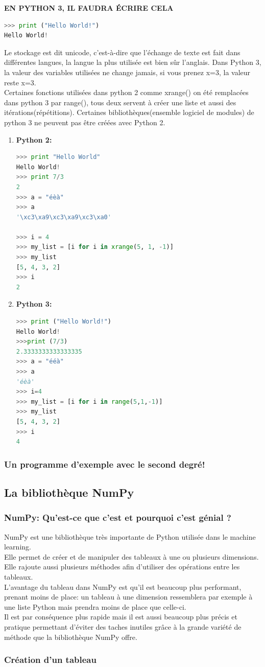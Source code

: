 \documentclass[a4paper, 12pt]{article}
\numberwithin{equation}{subsection}
\begin{document}
\textbf{EN PYTHON 3, IL FAUDRA ÉCRIRE CELA}\\
\begin{lstlisting}[language=Python]
>>> print ("Hello World!")
Hello World!
\end{lstlisting}
Le stockage est dit unicode, c'est-à-dire que l’échange de texte est fait dans différentes langues, la langue la plus utilisée est bien sûr l’anglais. Dans Python 3, la valeur des variables utilisées ne change jamais, si vous prenez x=3, la valeur reste x=3.\\
Certaines fonctions utilisées dans python 2 comme xrange() on été remplacées dans python 3 par range(), tous deux servent à créer une liste et aussi des itérations(répétitions). Certaines bibliothèques(ensemble logiciel de modules) de python 3 ne peuvent pas être créées avec Python 2.\\
\begin{enumerate}
  \item \textbf{Python 2:}
\begin{lstlisting}[language=Python]
>>> print "Hello World"
Hello World!
>>> print 7/3
2
>>> a = "éèà"
>>> a
'\xc3\xa9\xc3\xa9\xc3\xa0'

>>> i = 4
>>> my_list = [i for i in xrange(5, 1, -1)]
>>> my_list
[5, 4, 3, 2]
>>> i
2
\end{lstlisting}
  \item \textbf{Python 3:}
\begin{lstlisting}[language=Python]
>>> print ("Hello World!")
Hello World!
>>>print (7/3)
2.3333333333333335
>>> a = "ééà"
>>> a
'éèà'
>>> i=4
>>> my_list = [i for i in range(5,1,-1)]
>>> my_list
[5, 4, 3, 2]
>>> i
4
\end{lstlisting}
\end{enumerate}
\subsubsection{Un programme d'exemple avec le second degré!}

\subsection{ La bibliothèque NumPy}
\subsubsection{NumPy: Qu'est-ce que c'est et pourquoi c'est génial ?}
NumPy est une bibliothèque très importante de Python utilisée dans le machine learning. \\
Elle permet de créer et de manipuler des tableaux à une ou plusieurs dimensions. Elle rajoute aussi plusieurs méthodes afin d'utiliser des opérations entre les tableaux. \\
L'avantage du tableau dans NumPy est qu’il est beaucoup plus performant, prenant moins de place: un tableau à une dimension ressemblera par exemple à une liste Python mais prendra moins de place que celle-ci. \\
Il est par conséquence plus rapide mais il est aussi beaucoup plus précis et pratique permettant d’éviter des taches inutiles grâce à la grande variété de méthode que la bibliothèque NumPy offre.
\subsubsection{Création d'un tableau}
\end{document}
